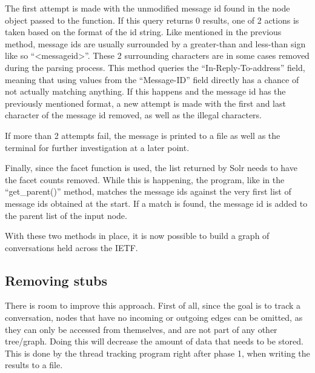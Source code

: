 \documentclass[a4paper,english]{report}
\begin{document}
The first attempt is made with the unmodified message id found in the node object passed to the function. If this query returns 0 results, one of 2 actions is taken based on the format of the id string. Like mentioned in the previous method, message ids are usually surrounded by a greater-than and less-than sign like so “<messageid>”.
These 2 surrounding characters are in some cases removed during the parsing process. This method queries the “In-Reply-To-address” field, meaning that using values from the “Message-ID” field directly has a chance of not actually matching anything. If this happens and the message id has the previously mentioned format, a new attempt is made with the first and last character of the message id removed, as well as the illegal characters.






If more than 2 attempts fail, the message is printed to a file as well as the terminal for further investigation at a later point.

Finally, since the facet function is used, the list returned by Solr needs to have the facet counts removed. While this is happening, the program, like in the “get\_parent()” method, matches the message ids against the very first list  of message ids obtained at the start. If a match is found, the message id is added to the parent list of the input node.







With these two methods in place, it is now possible to build a graph of conversations held across the IETF.




\subsection{Removing stubs}
There is room to improve this approach. First of all, since the goal is to track a conversation, nodes that have no incoming or outgoing edges can be omitted, as they can only be accessed from themselves, and are not part of any other tree/graph. Doing this will decrease the amount of data that needs to be stored.\\

This is done by the thread tracking program right after phase 1, when writing the results to a file.  
\end{document}
